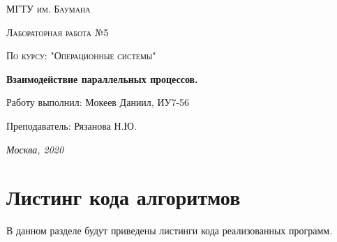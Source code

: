 \documentclass[12pt]{report}
\begin{document}
\begin{titlepage}
	\centering
	{\scshape\LARGE МГТУ им. Баумана \par}
	\vspace{3cm}
	{\scshape\Large Лабораторная работа №5\par}
	\vspace{0.5cm}	
	{\scshape\Large По курсу: "Операционные системы"\par}
	\vspace{1.5cm}
	\centering
	 {\huge\bfseries Взаимодействие параллельных процессов.\par}
	\vspace{2cm}
	\Large Работу выполнил: Мокеев Даниил, ИУ7-56\par
	\vspace{0.5cm}
	\Large Преподаватель:  Рязанова Н.Ю.\par

	\vfill
	\large \textit {Москва, 2020} \par
\end{titlepage}


\newpage

\section{Листинг кода алгоритмов}
В данном разделе будут приведены листинги кода реализованных программ. 
\end{document}
